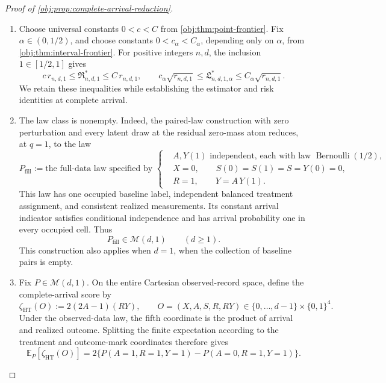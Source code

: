 \begin{proof}[Proof of \cref{obj:prop:complete-arrival-reduction}]
\begin{enumerate}
\item Choose universal constants \(0<c<C\) from \cref{obj:thm:point-frontier}. Fix \(\alpha\in(0,1/2)\), and choose constants \(0<c_\alpha<C_\alpha\), depending only on \(\alpha\), from \cref{obj:thm:interval-frontier}. For positive integers \(n,d\), the inclusion \(1\in[1/2,1]\) gives
\[
c\,r_{n,d,1}
\le \mathfrak R^*_{n,d,1}
\le C\,r_{n,d,1},
\qquad
c_\alpha\sqrt{r_{n,d,1}}
\le \mathfrak L^*_{n,d,1,\alpha}
\le C_\alpha\sqrt{r_{n,d,1}}.
\]
We retain these inequalities while establishing the estimator and risk identities at complete arrival.

\item The law class is nonempty. Indeed, the paired-law construction with zero perturbation and every latent draw at the residual zero-mass atom reduces, at \(q=1\), to the law
\[
P_{\mathrm{fill}}
:=
\text{the full-data law specified by }
\left\{
\begin{aligned}
&A,Y(1)\text{ independent, each with law }\operatorname{Bernoulli}(1/2),\\
&X=0,\qquad S(0)=S(1)=S=Y(0)=0,\\
&R=1,\qquad Y=A\,Y(1).
\end{aligned}
\right.
\]
This law has one occupied baseline label, independent balanced treatment assignment, and consistent realized measurements. Its constant arrival indicator satisfies conditional independence and has arrival probability one in every occupied cell. Thus
\[
P_{\mathrm{fill}}\in\mathcal M(d,1)
\qquad(d\ge1).
\]
This construction also applies when \(d=1\), when the collection of baseline pairs is empty.

\item Fix \(P\in\mathcal M(d,1)\). On the entire Cartesian observed-record space, define the complete-arrival score by
\[
\zeta_{\mathrm{HT}}(O)
:=2(2A-1)(RY),
\qquad
O=(X,A,S,R,RY)\in\{0,\ldots,d-1\}\times\{0,1\}^{4}.
\]
Under the observed-data law, the fifth coordinate is the product of arrival and realized outcome. Splitting the finite expectation according to the treatment and outcome-mark coordinates therefore gives
\[
\mathbb E_P[\zeta_{\mathrm{HT}}(O)]
=
2\bigl\{
P(A=1,R=1,Y=1)-P(A=0,R=1,Y=1)
\bigr\}.
\]


\end{enumerate}
\end{proof}
